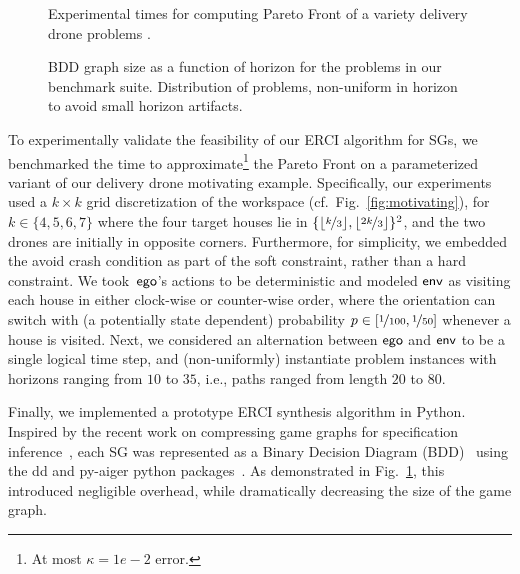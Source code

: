 \begin{figure*}
    \begin{subfigure}{0.5\textwidth}
  \centering
  \scalebox{0.58}{
    
    }
    \caption{
      Experimental times for computing Pareto Front of a variety
      delivery drone problems
      \label{fig:exp_times}.
    }
  \end{subfigure}
  \hfill
    \begin{subfigure}{0.5\textwidth}
    \centering \scalebox{0.53}{
      
    }
    \caption{
      BDD graph size as a function of horizon for the problems in our
      benchmark suite. Distribution of problems, non-uniform in horizon
      to avoid small horizon artifacts\label{fig:bdd_sizes}.
    }
  \end{subfigure}
\end{figure*}

To experimentally validate the feasibility of our ERCI algorithm for
SGs, we benchmarked the time to approximate\footnote{At most $\kappa =
1e-2$ error.} the Pareto Front on a parameterized variant of our
delivery drone motivating example. Specifically, our experiments used
a $k\times k$ grid discretization of the workspace (cf.\ Fig.~\ref{fig:motivating}), for $k \in
\{4,5,6,7\}$ where the four target houses lie in
$\{\lfloor\nicefrac{k}{3}\rfloor, \lfloor\nicefrac{2k}{3}\rfloor
\}^2$, and the two drones are initially in opposite
corners. Furthermore, for simplicity, we embedded the avoid crash
condition as part of the soft constraint, rather than a hard
constraint\footnotemark. We took~$\mathsf{ego}$'s actions to be deterministic
and modeled $\mathsf{env}$ as visiting each house in either clock-wise or
counter-wise order, where the orientation can switch with
(a potentially state dependent) probability $p \in [\nicefrac{1}{100},
\nicefrac{1}{50}]$ whenever a house is visited. Next, we considered an
alternation between $\mathsf{ego}$ and $\mathsf{env}$ to be a single logical time
step, and (non-uniformly) instantiate problem instances with horizons
ranging from $10$ to $35$, i.e., paths ranged from length $20$ to
$80$.


Finally, we implemented a prototype ERCI synthesis algorithm in Python.
Inspired by the recent work on compressing game graphs for specification
inference~\cite{DBLP:conf/cav/Vazquez-Chanlatte20}, each SG was represented
as a Binary Decision Diagram (BDD)~\cite{DBLP:journals/csur/Bryant92} using the
dd and py-aiger python packages~\cite{dd, pyAiger}. As demonstrated in Fig.~\ref{fig:exp_times},
this introduced negligible overhead, while dramatically decreasing the size
of the game graph.\footnotemark 


